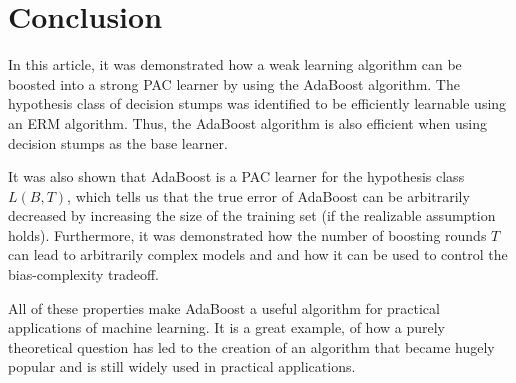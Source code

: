 \section{Conclusion}
\label{conclusion}

In this article, it was demonstrated how a weak learning algorithm can be boosted into a strong PAC learner by using the
AdaBoost algorithm.
The hypothesis class of decision stumps was identified to be efficiently learnable using an ERM algorithm.
Thus, the AdaBoost algorithm is also efficient when using decision stumps as the base learner.

It was also shown that AdaBoost is a PAC learner for the hypothesis class $L(B, T)$, which tells us
that the true error of AdaBoost can be arbitrarily decreased by increasing the size of the training set
(if the realizable assumption holds).
Furthermore, it was demonstrated how the number of boosting rounds $T$ can lead to arbitrarily complex models and
and how it can be used to control the bias-complexity tradeoff.

All of these properties make AdaBoost a useful algorithm for practical applications of machine learning.
It is a great example, of how a purely theoretical question has led to the creation of an algorithm that became 
hugely popular and is still widely used in practical applications.
